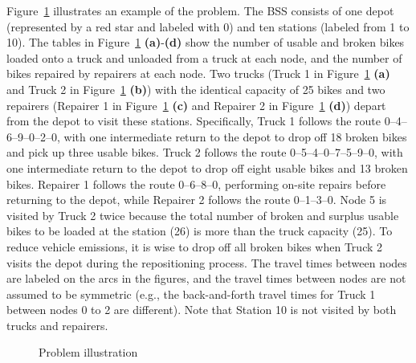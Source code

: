 Figure~\ref{ch4:fig:problem-illustration} illustrates an example of the problem. The BSS consists of one depot (represented by a red
star and labeled with 0) and ten stations (labeled from 1 to 10). The tables in Figure~\ref{ch4:fig:problem-illustration}
\textbf{(a)}-\textbf{(d)} show the number of usable and broken bikes loaded onto a truck and
unloaded from a truck at each node, and the number of bikes repaired by repairers at each node. Two
trucks (Truck 1 in Figure~\ref{ch4:fig:problem-illustration} \textbf{(a)} and Truck 2 in Figure~\ref{ch4:fig:problem-illustration} \textbf{(b)}) with the identical
capacity of 25 bikes and two repairers (Repairer 1 in Figure~\ref{ch4:fig:problem-illustration} \textbf{(c)} and Repairer 2 in Figure~\ref{ch4:fig:problem-illustration} \textbf{(d)}) depart from the depot to visit these stations. Specifically, Truck 1 follows the
route 0--4--6--9--0--2--0, with one intermediate return to the depot to drop off 18 broken bikes and
pick up three usable bikes. Truck 2 follows the route 0--5--4--0--7--5--9--0, with one intermediate
return to the depot to drop off eight usable bikes and 13 broken bikes. Repairer 1 follows the route
0--6--8--0, performing on-site repairs before returning to the depot, while Repairer 2 follows the
route 0--1--3--0. Node 5 is visited by Truck 2 twice because the total number of broken and surplus
usable bikes to be loaded at the station (26) is more than the truck capacity (25). To reduce
vehicle emissions, it is wise to drop off all broken bikes when Truck 2 visits the depot during the
repositioning process. The travel times between nodes are labeled on the arcs in the figures, and
the travel times between nodes are not assumed to be symmetric (e.g., the back-and-forth travel
times for Truck 1 between nodes 0 to 2 are different). Note that Station 10 is not visited by both
trucks and repairers.

\begin{figure}[htbp]
\centering
{}
\caption{Problem illustration}
\label{ch4:fig:problem-illustration}
\end{figure}

